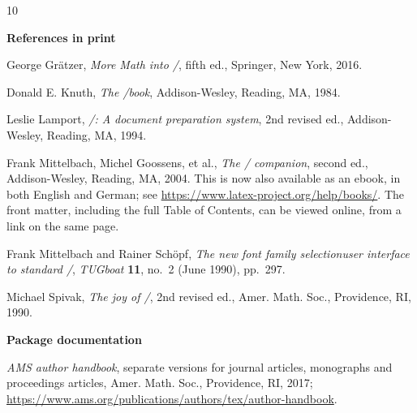 \documentclass[leqno,titlepage,openany]{amsldoc}[1999/12/13]
\renewcommand\bibname{References}
\newcommand{\nipkg}{\textsf}
\newcommand{\booktitle}[1]{\textit{#1}}
\newcommand{\journalname}[1]{\textit{#1}}
\newif\iffirstbibsubhead \firstbibsubheadtrue
\newcommand{\bibsubhead}[1]{%
  \iffirstbibsubhead \firstbibsubheadfalse
  \else \addvspace{\medskipamount}
  \fi
  \item[]\hspace*{-\leftmargin}\textbf{#1}\par
  \vspace{\smallskipamount}
}
\begin{document}
\begin{thebibliography}{10}
\addcontentsline{toc}{chapter}{\bibname}

\raggedright

\bibsubhead{References in print}

 George Gr\"atzer, \booktitle{More Math into \latex/}, fifth ed.,
Springer, New York, 2016.

 Donald E. Knuth, \booktitle{The \tex/book},
Addison-Wesley, Reading, MA, 1984.

 Leslie Lamport, \booktitle{\latex/: A document preparation
system}, 2nd revised ed., Addison-Wesley, Reading, MA, 1994.

 Frank Mittelbach, Michel Goossens, et al.,
\booktitle{The \latex/ companion}, second ed., Addison-Wesley, Reading,
MA, 2004.  This is now also available as an ebook, in both English and
German; see \url{https://www.latex-project.org/help/books/}.
The front matter, including the full Table of Contents, can be viewed
online, from a link on the same page.

 Frank Mittelbach and Rainer Sch\"opf,
\textit{The new font family selection\mdash user
interface to standard \latex/}, \journalname{TUGboat} \textbf{11},
no.~2 (June 1990), pp.~297.

 Michael Spivak, \booktitle{The joy of \tex/}, 2nd revised ed.,
Amer. Math. Soc., Providence, RI, 1990.

\bibsubhead{Package documentation}

\booktitle{AMS author handbook}, separate versions
for journal articles, monographs and proceedings articles, Amer. Math.
Soc., Providence, RI, 2017;
\url{https://www.ams.org/publications/authors/tex/author-handbook}.


\end{thebibliography}
\end{document}
